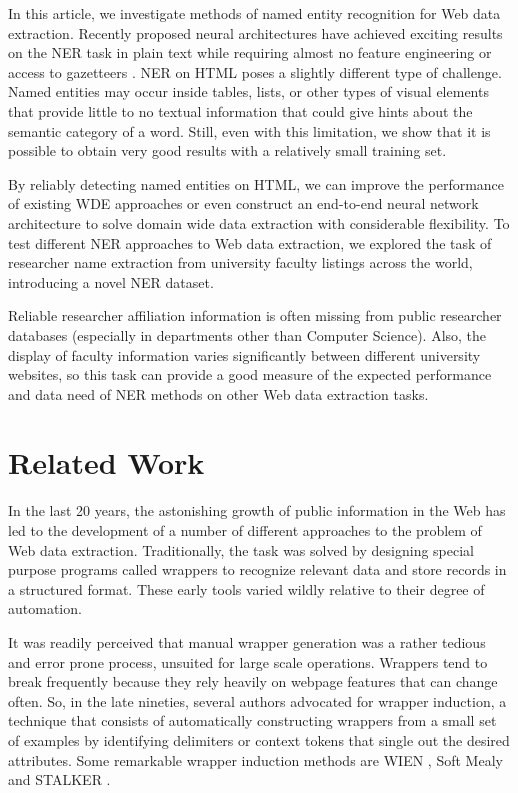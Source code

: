 \documentclass{nle}
\begin{document}
In this article, we investigate methods of named entity recognition for Web data extraction.
Recently proposed neural architectures have achieved exciting results 
on the NER task in plain text while requiring almost 
no feature engineering or access to gazetteers \cite{Huang2015,Lample2016,Ma2016}. 
NER on HTML poses a slightly different type of challenge. Named entities may occur inside 
tables, lists, or other types of visual elements that provide little to no textual 
information that could give hints about the semantic category of a word. Still, even 
with this limitation, we show that it is possible to obtain very good results with a 
relatively small training set.

By reliably detecting named entities on HTML, we can improve the performance of existing WDE 
approaches or even construct an end-to-end neural network architecture to solve domain 
wide data extraction with considerable flexibility. To test different NER approaches to
Web data extraction, we explored the task of researcher name extraction from university 
faculty listings across the world, introducing a novel NER dataset.

Reliable researcher affiliation information is often missing from public researcher 
databases (especially in departments other than Computer Science). Also, the display of 
faculty information varies significantly between different university websites, so 
this task can provide a good measure of the expected performance and data need of
NER methods on other Web data extraction tasks. 


\section{Related Work}

In the last 20 years, the astonishing growth of public information in the Web has 
led to the development of a number of different approaches to the problem of Web 
data extraction. Traditionally, the task was solved by designing special purpose
programs called wrappers to recognize relevant data and store records in a structured
format. These early tools varied wildly relative to their degree of automation. 

It was readily perceived that manual wrapper generation was a rather tedious and
error prone process, unsuited for large scale operations. Wrappers tend to
break frequently because they rely heavily on webpage features that can change 
often. So, in the late nineties, several authors advocated for wrapper induction, a technique 
that consists of automatically constructing wrappers from a small set of examples by 
identifying delimiters or context tokens that single out the desired attributes. 
Some remarkable wrapper induction methods are WIEN \cite{Kushmerick2000}, Soft 
Mealy \cite{Hsu1998} and STALKER \cite{Muslea1999}.
\end{document}
